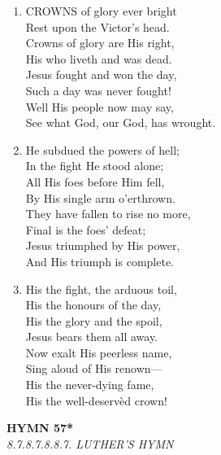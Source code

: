 \begin{enumerate}
    \item CROWNS of glory ever bright \\
        Rest upon the Victor's head. \\
        Crowns of glory are His right, \\
        His who liveth and was dead. \\
        Jesus fought and won the day, \\
        Such a day was never fought! \\
        Well His people now may say, \\
        See what God, our God, has wrought.

    \item He subdued the powers of hell; \\
        In the fight He stood alone; \\
        All His foes before Him fell, \\
        By His single arm o'erthrown. \\
        They have fallen to rise no more, \\
        Final is the foes' defeat; \\
        Jesus triumphed by His power, \\
        And His triumph is complete.

    \item His the fight, the arduous toil, \\
        His the honours of the day, \\
        His the glory and the spoil, \\
        Jesus bears them all away. \\
        Now exalt His peerless name, \\
        Sing aloud of His renown--- \\
        His the never-dying fame, \\
        His the well-deserv\`ed crown!

\end{enumerate}

\newpage
\begin{center}
    {\Large \textbf{HYMN 57*}}
    \\
    \textit{8.7.8.7.8.8.7. LUTHER'S HYMN}
\end{center}
\vspace{1em}

